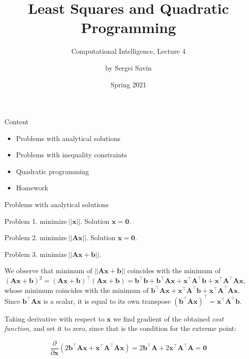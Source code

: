 \documentclass{beamer}
\title{Least Squares and Quadratic Programming}
\subtitle{Computational Intelligence, Lecture 4}
\author{by Sergei Savin}
\date{Spring 2021}
\begin{document}
\maketitle


\begin{frame}{Content}

\begin{itemize}
\item Problems with analytical solutions
\item Problems with inequality constraints
\item Quadratic programming
\item Homework
\end{itemize}

\end{frame}



\begin{frame}{Problems with analytical solutions}
\begin{flushleft}

Problem 1. $\text{minimize} \ ||\mathbf{x}||$. Solution $\mathbf{x} = \mathbf{0}$.

\bigskip

Problem 2. $\text{minimize} \ ||\mathbf{A}\mathbf{x}||$. Solution $\mathbf{x} = \mathbf{0}$.

\bigskip

Problem 3. $\text{minimize} \ ||\mathbf{A}\mathbf{x} + \mathbf{b}||$. 

\bigskip

We observe that minimum of $||\mathbf{A}\mathbf{x} + \mathbf{b}||$ coincides with the minimum of $(\mathbf{A}\mathbf{x} + \mathbf{b})^2 = (\mathbf{A}\mathbf{x} + \mathbf{b})^\top (\mathbf{A}\mathbf{x} + \mathbf{b}) = \mathbf{b}^\top\mathbf{b} + \mathbf{b}^\top\mathbf{A}\mathbf{x} + \mathbf{x}^\top\mathbf{A}^\top\mathbf{b} + \mathbf{x}^\top\mathbf{A}^\top\mathbf{A}\mathbf{x}$, whose minimum coincides with the minimum of $\mathbf{b}^\top\mathbf{A}\mathbf{x} + \mathbf{x}^\top\mathbf{A}^\top\mathbf{b} + \mathbf{x}^\top\mathbf{A}^\top\mathbf{A}\mathbf{x}$. Since $\mathbf{b}^\top\mathbf{A}\mathbf{x}$ is a scalar, it is equal to its own transpose $(\mathbf{b}^\top\mathbf{A}\mathbf{x})^\top = \mathbf{x}^\top\mathbf{A}^\top\mathbf{b}$.

Taking derivative with respect to $\mathbf{x}$ we find gradient of the obtained \emph{cost function}, and set it to zero, since that is the condition for the extreme point:

\begin{equation}
    \frac{\partial}{\partial \mathbf{x}} (2\mathbf{b}^\top\mathbf{A}\mathbf{x} + \mathbf{x}^\top\mathbf{A}^\top\mathbf{A}\mathbf{x}) = 2\mathbf{b}^\top\mathbf{A} + 2\mathbf{x}^\top\mathbf{A}^\top\mathbf{A} = \mathbf{0}
\end{equation}
 
\end{flushleft}
\end{frame}
\end{document}
